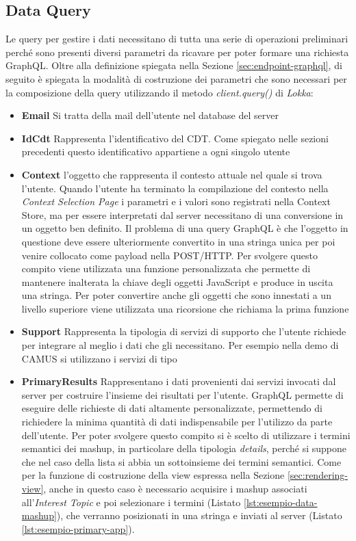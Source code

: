 \subsection{Data Query} \label{sec:data-query}
Le query per gestire i dati necessitano di tutta una serie di operazioni preliminari perché sono presenti diversi parametri da ricavare per poter formare una richiesta GraphQL. Oltre alla definizione spiegata nella Sezione \ref{sec:endpoint-graphql}, di seguito è spiegata la modalità di costruzione dei parametri che sono necessari per la composizione della query utilizzando il metodo \emph{client.query()} di \emph{Lokka}:
\begin{itemize}
	\item \textbf{Email} Si tratta della mail dell'utente nel database del server
	\item \textbf{IdCdt} Rappresenta l'identificativo del CDT. Come spiegato nelle sezioni precedenti questo identificativo appartiene a ogni singolo utente
	\item \textbf{Context} \upe l'oggetto che rappresenta il contesto attuale nel quale si trova l'utente. Quando l'utente ha terminato la compilazione del contesto nella \emph{Context Selection Page} i parametri e i valori sono registrati nella Context Store, ma per essere interpretati dal server necessitano di una conversione in un oggetto ben definito. Il problema di una query GraphQL è che l'oggetto in questione deve essere ulteriormente convertito in una stringa unica per poi venire collocato come payload nella POST/HTTP. Per svolgere questo compito viene utilizzata una funzione personalizzata che permette di mantenere inalterata la chiave degli oggetti JavaScript e produce in uscita una stringa. Per poter convertire anche gli oggetti che sono innestati a un livello superiore viene utilizzata una ricorsione che richiama la prima funzione
	\item \textbf{Support} Rappresenta la tipologia di servizi di supporto che l'utente richiede per integrare al meglio i dati che gli necessitano. Per esempio nella demo di CAMUS si utilizzano i servizi di tipo 
	\item \textbf{PrimaryResults} Rappresentano i dati provenienti dai servizi invocati dal server per costruire l'insieme dei risultati per l'utente. GraphQL permette di eseguire delle richieste di dati altamente personalizzate, permettendo di richiedere la minima quantità di dati indispensabile per l'utilizzo da parte dell'utente. Per poter svolgere questo compito si è scelto di utilizzare i termini semantici dei mashup, in particolare della tipologia \emph{details}, perché si suppone che nel caso della lista si abbia un sottoinsieme dei termini semantici. Come per la funzione di costruzione della view espressa nella Sezione \ref{sec:rendering-view}, anche in questo caso è necessario acquisire i mashup associati all'\emph{Interest Topic} e poi selezionare i termini (Listato \ref{lst:esempio-data-mashup}), che verranno posizionati in una stringa e inviati al server (Listato \ref{lst:esempio-primary-app}).

\end{itemize}
